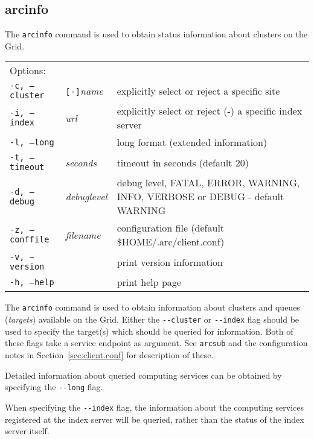\subsection{arcinfo}
\label{sec:arcinfo}

The \texttt{arcinfo}  command is used to obtain status information about clusters on the Grid.

\hspace*{0.5cm}
\begin{shaded}
\end{shaded}
\begin{longtable}{llp{8cm}}
   Options:&&\\
   \texttt{-c, --cluster}&\verb#[-]#\textit{name}&explicitly select or reject a specific site\\
   \texttt{-i, --index}&\textit{url}&explicitly select or reject (-) a specific index server\\
   \texttt{-l, --long}& & long format (extended information)\\
   \texttt{-t, --timeout}&\textit{seconds}&timeout in seconds (default 20)\\
   \texttt{-d, --debug}&\textit{debuglevel}&debug level, FATAL, ERROR, WARNING, INFO, VERBOSE or DEBUG - default WARNING\\
   \texttt{-z, --conffile}&\textit{filename}& configuration file (default {\$}HOME/.arc/client.conf)\\
   \texttt{-v, --version}&&print version information\\
   \texttt{-h, --help}&&print help page\\
\end{longtable}

The  \texttt{arcinfo}  command is used to obtain information about clusters and queues (\textit{targets})
available on the Grid. Either the \verb#--cluster# or \verb#--index# flag should be used to specify the
target(s) which should be queried for information. Both of these flags take a service endpoint as argument.
See \texttt{arcsub} and the configuration notes in Section~\ref{sec:client.conf} for description of these.

Detailed information about queried computing services can be obtained by specifying the \verb#--long# flag.

When  specifying  the  \verb#--index#  flag,  the  information about the computing services registered at the index server will
be queried, rather than the status of the index server itself.


